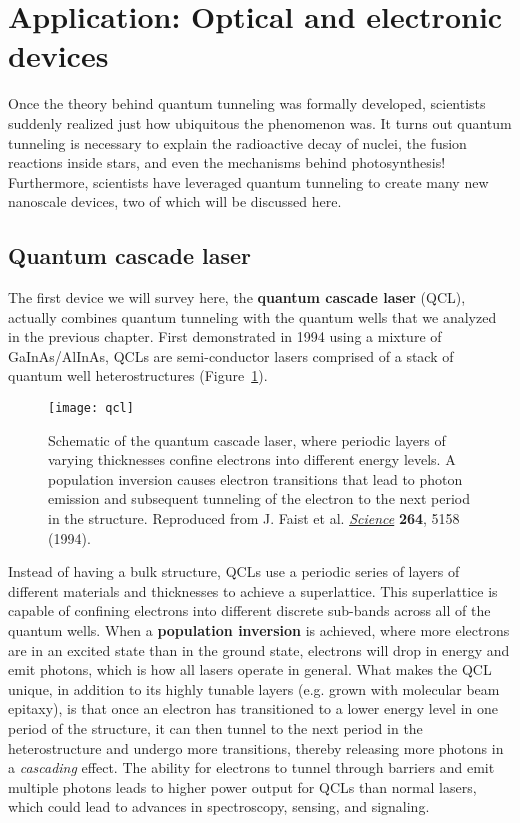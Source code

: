 
\section[Application: Devices]{Application: Optical and electronic devices}
Once the theory behind quantum tunneling was formally developed, scientists suddenly realized just how ubiquitous the phenomenon was. It turns out quantum tunneling is necessary to explain the radioactive decay of nuclei, the fusion reactions inside stars, and even the mechanisms behind photosynthesis! Furthermore, scientists have leveraged quantum tunneling to create many new nanoscale devices, two of which will be discussed here.

\subsection{Quantum cascade laser}
The first device we will survey here, the \textbf{quantum cascade laser} (QCL), actually combines quantum tunneling with the quantum wells that we analyzed in the previous chapter. First demonstrated in 1994 using a mixture of GaInAs/AlInAs, QCLs are semi-conductor lasers comprised of a stack of quantum well heterostructures (Figure~\ref{fig:qcl}).

\begin{figure}[!h]
	\centering
	\texttt{[image: qcl]}
	\caption{Schematic of the quantum cascade laser, where periodic layers of varying thicknesses confine electrons into different energy levels. A population inversion causes electron transitions that lead to photon emission and subsequent tunneling of the electron to the next period in the structure. Reproduced from J. Faist et al. \href{http://science.sciencemag.org/content/264/5158/553}{\emph{Science}} \textbf{264}, 5158 (1994).}
	\label{fig:qcl}
\end{figure}

Instead of having a bulk structure, QCLs use a periodic series of layers of different materials and thicknesses to achieve a superlattice. This superlattice is capable of confining electrons into different discrete sub-bands across all of the quantum wells. When a \textbf{population inversion} is achieved, where more electrons are in an excited state than in the ground state, electrons will drop in energy and emit photons, which is how all lasers operate in general. What makes the QCL unique, in addition to its highly tunable layers (e.g. grown with molecular beam epitaxy), is that once an electron has transitioned to a lower energy level in one period of the structure, it can then tunnel to the next period in the heterostructure and undergo more transitions, thereby releasing more photons in a \emph{cascading} effect. The ability for electrons to tunnel through barriers and emit multiple photons leads to higher power output for QCLs than normal lasers, which could lead to advances in spectroscopy, sensing, and signaling.

